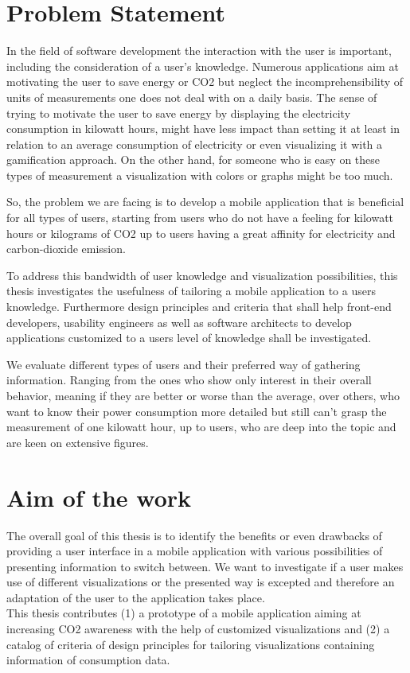 \section{Problem Statement}

In the field of software development the interaction with the user is important, including the consideration of a user's knowledge. Numerous applications aim at motivating the user to save energy or CO2 but neglect the incomprehensibility of units of measurements one does not deal with on a daily basis. The sense of trying to motivate the user to save energy by displaying the electricity consumption in kilowatt hours, might have less impact than setting it at least in relation to an average consumption of electricity or even visualizing it with a gamification approach. On the other hand, for someone who is easy on these types of measurement a visualization with colors or graphs might be too much.

So, the problem we are facing is to develop a mobile application that is beneficial for all types of users, starting from users who do not have a feeling for kilowatt hours or kilograms of CO2 up to users having a great affinity for electricity and carbon-dioxide emission.

To address this bandwidth of user knowledge and visualization possibilities, this thesis investigates the usefulness of tailoring a mobile application to a users knowledge. Furthermore design principles and criteria that shall help front-end developers, usability engineers as well as software architects to develop applications customized to a users level of knowledge shall be investigated.

We evaluate different types of users and their preferred way of gathering information. Ranging from the ones who show only interest in their overall behavior, meaning if they are better or worse than the average, over others, who want to know their power consumption more detailed but still can't grasp the measurement of one kilowatt hour, up to users, who are deep into the topic and are keen on extensive figures.

\section{Aim of the work} 
The overall goal of this thesis is to identify the benefits or even drawbacks of providing a user interface in a mobile application with various possibilities of presenting information to switch between. We want to investigate if a user makes use of different visualizations or the presented way is excepted and therefore an adaptation of the user to the application takes place.\\
This thesis contributes 
(1) a prototype of a mobile application aiming at increasing CO2 awareness with the help of customized visualizations and
(2) a catalog of criteria of design principles for tailoring visualizations containing information of consumption data.

